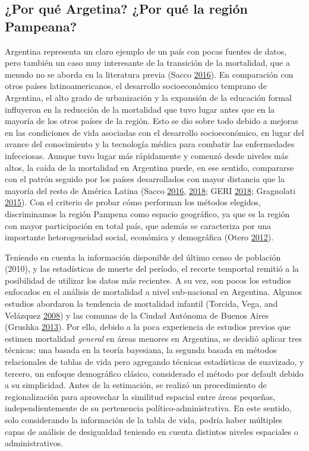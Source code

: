 \documentclass[12pt,]{article}
\begin{document}
\hypertarget{por-quuxe9-argetina-por-quuxe9-la-regiuxf3n-pampeana}{%
\subsection{¿Por qué Argetina? ¿Por qué la región
Pampeana?}\label{por-quuxe9-argetina-por-quuxe9-la-regiuxf3n-pampeana}}

Argentina representa un claro ejemplo de un país con pocas fuentes de
datos, pero también un caso muy interesante de la transición de la
mortalidad, que a menudo no se aborda en la literatura previa (Sacco
\protect\hyperlink{ref-Sacco2016}{2016}). En comparación con otros
países latinoamericanos, el desarrollo socioeconómico temprano de
Argentina, el alto grado de urbanización y la expansión de la educación
formal influyeron en la reducción de la mortalidad que tuvo lugar antes
que en la mayoría de los otros países de la región. Esto se dio sobre
todo debido a mejoras en las condiciones de vida asociadas con el
desarrollo socioeconómico, en lugar del avance del conocimiento y la
tecnología médica para combatir las enfermedades infecciosas. Aunque
tuvo lugar más rápidamente y comenzó desde niveles más altos, la caída
de la mortalidad en Argentina puede, en ese sentido, compararse con el
patrón seguido por los países desarrollados con mayor distancia que la
mayoría del resto de América Latina (Sacco
\protect\hyperlink{ref-Sacco2016}{2016},
\protect\hyperlink{ref-SaccoBorges2018}{2018}; GERI
\protect\hyperlink{ref-GeriMoscoso2018}{2018}; Gragnolati
\protect\hyperlink{ref-Gragnolati2015}{2015}). Con el criterio de probar
cómo performan los métodos elegidos, discriminamos la región Pampena
como espacio geográfico, ya que es la región con mayor participación en
total país, que además se caracteriza por una importante hetorogeneidad
social, económica y demográfica (Otero
\protect\hyperlink{ref-Otero2012}{2012}).

Teniendo en cuenta la información disponible del último censo de
población (2010), y las estadísticas de muerte del período, el recorte
temportal remitió a la posibilidad de utilizar los datos más recientes.
A su vez, son pocos los estudios enfocados en el análisis de mortalidad
a nivel sub-nacional en Argentina. Algunos estudios abordaron la
tendencia de mortalidad infantil (Torcida, Vega, and Velázquez
\protect\hyperlink{ref-Torcida2008}{2008}) y las comunas de la Ciudad
Autónoma de Buenos Aires (Grushka
\protect\hyperlink{ref-Grushka2013}{2013}). Por ello, debido a la poca
experiencia de estudios previos que estimen mortalidad \emph{general} en
áreas menores en Argentina, se decidió aplicar tres técnicas: una basada
en la teoría bayesiana, la segunda basada en métodos relacionales de
tablas de vida pero agregando técnicas estadísticas de suavizado, y
tercero, un enfoque demográfico clásico, considerado el método por
default debido a su simplicidad. Antes de la estimación, se realizó un
procedimiento de regionalización para aprovechar la similitud espacial
entre áreas pequeñas, independientemente de su pertenencia
político-administrativa. En este sentido, solo considerando la
información de la tabla de vida, podría haber múltiples capas de
análisis de desigualdad teniendo en cuenta distintos niveles espaciales
o administrativos.
\end{document}
